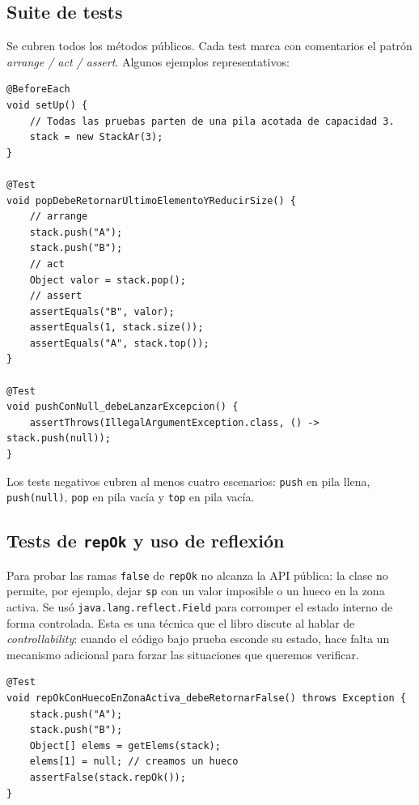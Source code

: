 \documentclass[12pt,a4paper]{article}
\begin{document}
\subsection{Suite de tests}
Se cubren todos los métodos públicos. Cada test marca con comentarios el patrón \textit{arrange / act / assert}. Algunos ejemplos representativos:

\begin{lstlisting}[style=javastyle]
@BeforeEach
void setUp() {
    // Todas las pruebas parten de una pila acotada de capacidad 3.
    stack = new StackAr(3);
}

@Test
void popDebeRetornarUltimoElementoYReducirSize() {
    // arrange
    stack.push("A");
    stack.push("B");
    // act
    Object valor = stack.pop();
    // assert
    assertEquals("B", valor);
    assertEquals(1, stack.size());
    assertEquals("A", stack.top());
}

@Test
void pushConNull_debeLanzarExcepcion() {
    assertThrows(IllegalArgumentException.class, () -> stack.push(null));
}
\end{lstlisting}

Los tests negativos cubren al menos cuatro escenarios: \texttt{push} en pila llena, \texttt{push(null)}, \texttt{pop} en pila vacía y \texttt{top} en pila vacía.

\subsection{Tests de \texttt{repOk} y uso de reflexión}
Para probar las ramas \texttt{false} de \texttt{repOk} no alcanza la API pública: la clase no permite, por ejemplo, dejar \texttt{sp} con un valor imposible o un hueco en la zona activa. Se usó \texttt{java.lang.reflect.Field} para corromper el estado interno de forma controlada. Esta es una técnica que el libro discute al hablar de \textit{controllability}: cuando el código bajo prueba esconde su estado, hace falta un mecanismo adicional para forzar las situaciones que queremos verificar.

\begin{lstlisting}[style=javastyle]
@Test
void repOkConHuecoEnZonaActiva_debeRetornarFalse() throws Exception {
    stack.push("A");
    stack.push("B");
    Object[] elems = getElems(stack);
    elems[1] = null; // creamos un hueco
    assertFalse(stack.repOk());
}
\end{lstlisting}
\end{document}
